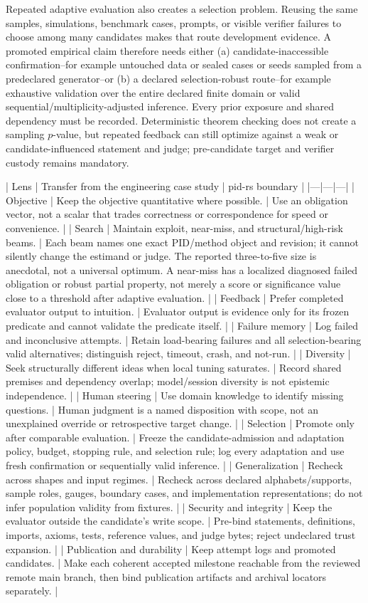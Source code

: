 \documentclass[11pt]{article}
\begin{document}
\begin{markdown}
Repeated adaptive evaluation also creates a selection problem. Reusing the same samples,
simulations, benchmark cases, prompts, or visible verifier failures to choose among many candidates
makes that route development evidence. A promoted empirical claim therefore needs either (a)
candidate-inaccessible confirmation--for example untouched data or sealed cases or seeds sampled
from a predeclared generator--or (b) a declared selection-robust route--for example exhaustive
validation over the entire declared finite domain or valid sequential/multiplicity-adjusted
inference. Every prior exposure and shared dependency must be recorded.
Deterministic theorem checking does not create a sampling $p$-value, but repeated feedback
can still optimize against a weak or candidate-influenced statement and judge; pre-candidate target
and verifier custody remains mandatory.

| Lens | Transfer from the engineering case study | pid-rs boundary |
|---|---|---|
| Objective | Keep the objective quantitative where possible. | Use an obligation vector, not a scalar that trades correctness or correspondence for speed or convenience. |
| Search | Maintain exploit, near-miss, and structural/high-risk beams. | Each beam names one exact PID/method object and revision; it cannot silently change the estimand or judge. The reported three-to-five size is anecdotal, not a universal optimum. A near-miss has a localized diagnosed failed obligation or robust partial property, not merely a score or significance value close to a threshold after adaptive evaluation. |
| Feedback | Prefer completed evaluator output to intuition. | Evaluator output is evidence only for its frozen predicate and cannot validate the predicate itself. |
| Failure memory | Log failed and inconclusive attempts. | Retain load-bearing failures and all selection-bearing valid alternatives; distinguish reject, timeout, crash, and not-run. |
| Diversity | Seek structurally different ideas when local tuning saturates. | Record shared premises and dependency overlap; model/session diversity is not epistemic independence. |
| Human steering | Use domain knowledge to identify missing questions. | Human judgment is a named disposition with scope, not an unexplained override or retrospective target change. |
| Selection | Promote only after comparable evaluation. | Freeze the candidate-admission and adaptation policy, budget, stopping rule, and selection rule; log every adaptation and use fresh confirmation or sequentially valid inference. |
| Generalization | Recheck across shapes and input regimes. | Recheck across declared alphabets/supports, sample roles, gauges, boundary cases, and implementation representations; do not infer population validity from fixtures. |
| Security and integrity | Keep the evaluator outside the candidate's write scope. | Pre-bind statements, definitions, imports, axioms, tests, reference values, and judge bytes; reject undeclared trust expansion. |
| Publication and durability | Keep attempt logs and promoted candidates. | Make each coherent accepted milestone reachable from the reviewed remote main branch, then bind publication artifacts and archival locators separately. |


\end{markdown}
\end{document}
